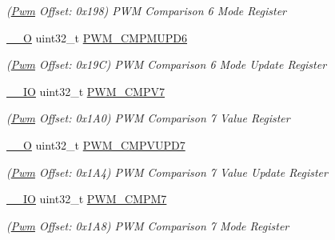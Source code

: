 \begin{DoxyCompactItemize}
\begin{DoxyCompactList}\small\item\em (\mbox{\hyperlink{structPwm}{Pwm}} Offset\+: 0x198) P\+WM Comparison 6 Mode Register \end{DoxyCompactList}\item 
\mbox{\label{structPwm_a6f62386d26d623e2c14736219d974e13}} 
\mbox{\hyperlink{core__cm7_8h_a7e25d9380f9ef903923964322e71f2f6}{\+\_\+\+\_\+O}} uint32\+\_\+t \mbox{\hyperlink{structPwm_a6f62386d26d623e2c14736219d974e13}{P\+W\+M\+\_\+\+C\+M\+P\+M\+U\+P\+D6}}
\begin{DoxyCompactList}\small\item\em (\mbox{\hyperlink{structPwm}{Pwm}} Offset\+: 0x19C) P\+WM Comparison 6 Mode Update Register \end{DoxyCompactList}\item 
\mbox{\label{structPwm_a5e0d56fe48d8eccc3e221b4ac45aeb4b}} 
\mbox{\hyperlink{core__cm7_8h_aec43007d9998a0a0e01faede4133d6be}{\+\_\+\+\_\+\+IO}} uint32\+\_\+t \mbox{\hyperlink{structPwm_a5e0d56fe48d8eccc3e221b4ac45aeb4b}{P\+W\+M\+\_\+\+C\+M\+P\+V7}}
\begin{DoxyCompactList}\small\item\em (\mbox{\hyperlink{structPwm}{Pwm}} Offset\+: 0x1\+A0) P\+WM Comparison 7 Value Register \end{DoxyCompactList}\item 
\mbox{\label{structPwm_aac47dfec146ec3ffc1c8a6fb3426ce9a}} 
\mbox{\hyperlink{core__cm7_8h_a7e25d9380f9ef903923964322e71f2f6}{\+\_\+\+\_\+O}} uint32\+\_\+t \mbox{\hyperlink{structPwm_aac47dfec146ec3ffc1c8a6fb3426ce9a}{P\+W\+M\+\_\+\+C\+M\+P\+V\+U\+P\+D7}}
\begin{DoxyCompactList}\small\item\em (\mbox{\hyperlink{structPwm}{Pwm}} Offset\+: 0x1\+A4) P\+WM Comparison 7 Value Update Register \end{DoxyCompactList}\item 
\mbox{\label{structPwm_a218c85fe7eb2597df747e2094d9b1eb3}} 
\mbox{\hyperlink{core__cm7_8h_aec43007d9998a0a0e01faede4133d6be}{\+\_\+\+\_\+\+IO}} uint32\+\_\+t \mbox{\hyperlink{structPwm_a218c85fe7eb2597df747e2094d9b1eb3}{P\+W\+M\+\_\+\+C\+M\+P\+M7}}
\begin{DoxyCompactList}\small\item\em (\mbox{\hyperlink{structPwm}{Pwm}} Offset\+: 0x1\+A8) P\+WM Comparison 7 Mode Register \end{DoxyCompactList}\item 

\end{DoxyCompactItemize}
